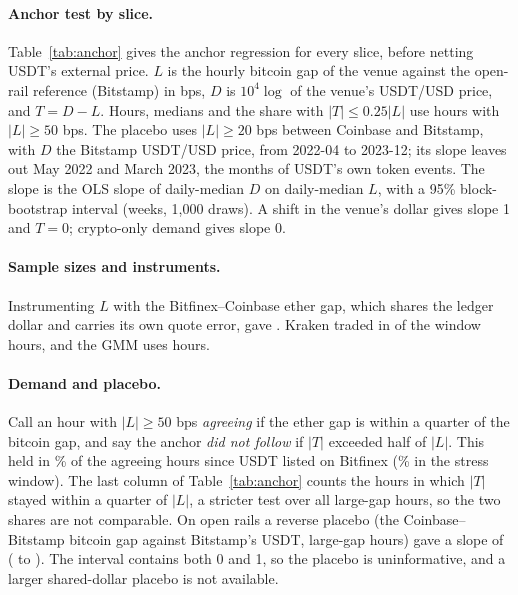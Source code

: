 \documentclass[sigconf,review,anonymous]{acmart}
\begin{document}
\paragraph{Anchor test by slice.} Table~\ref{tab:anchor} gives the anchor regression for every slice, before netting
USDT's external price. $L$ is the hourly bitcoin gap of the venue against the open-rail reference (Bitstamp) in bps, $D$ is
$10^4\log$ of the venue's USDT/USD price, and $T=D-L$. Hours, medians and the share with $|T|\le 0.25|L|$ use hours with
$|L|\ge 50$ bps. The placebo uses $|L|\ge 20$ bps between Coinbase and Bitstamp, with $D$ the Bitstamp USDT/USD price, from
2022-04 to 2023-12; its slope leaves out May 2022 and March 2023, the months of USDT's own token events. The slope is the OLS
slope of daily-median $D$ on daily-median $L$, with a 95\% block-bootstrap interval (weeks, 1,000 draws). A shift in the
venue's dollar gives slope 1 and $T=0$; crypto-only demand gives slope 0.


\paragraph{Sample sizes and instruments.} Instrumenting $L$ with the Bitfinex--Coinbase ether gap, which shares the ledger dollar and carries its own quote
error, gave \NumKStressDayIvAdj{}. Kraken traded in \NumKCovTraded{} of the \NumKCovHours{} window hours, and the GMM uses \NumGBfxPrimaryN{} hours.

\paragraph{Demand and placebo.} Call an hour with $|L|\ge 50$ bps \emph{agreeing} if the ether gap is within a quarter of
the bitcoin gap, and say the anchor \emph{did not follow} if $|T|$ exceeded half of $|L|$. This held in
\NumUAnchorDemandShare\% of the \NumUAnchorDemandHours{} agreeing hours since USDT listed on Bitfinex
(\NumUAnchorDemandStressShare\% in the stress window). The last column of Table~\ref{tab:anchor} counts the hours in which $|T|$ stayed within a quarter of $|L|$, a stricter test over all large-gap hours, so the two shares are not comparable. On open rails a reverse placebo (the Coinbase--Bitstamp bitcoin gap against Bitstamp's USDT, \NumUAnchorPlaceboHours{} large-gap hours)
gave a slope of \NumUAnchorPlaceboSlope{} (\NumUAnchorPlaceboSlopeLo{} to \NumUAnchorPlaceboSlopeHi{}). The interval contains both 0 and 1, so the placebo is uninformative, and a larger shared-dollar placebo is not available.
\end{document}
